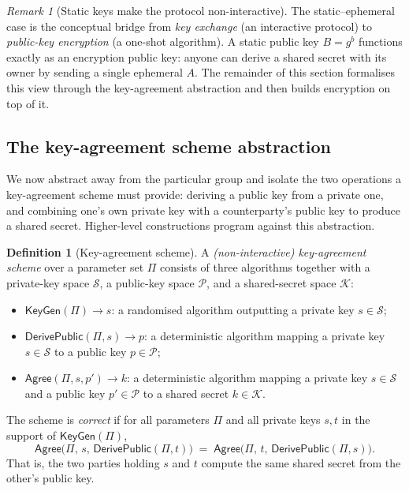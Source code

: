 \documentclass[11pt,a4paper]{article}
\theoremstyle{definition}
\newtheorem{definition}[theorem]{Definition}
\theoremstyle{remark}
\newtheorem{remark}[theorem]{Remark}
\begin{document}
\begin{remark}[Static keys make the protocol non-interactive]\label{keyagreement:rem:noninteractive}
The static--ephemeral case is the conceptual bridge from \emph{key exchange} (an interactive protocol) to \emph{public-key encryption} (a one-shot algorithm). A static public key \(B = g^b\) functions exactly as an encryption public key: anyone can derive a shared secret with its owner by sending a single ephemeral \(A\). The remainder of this section formalises this view through the key-agreement abstraction and then builds encryption on top of it.
\end{remark}

\subsection{The key-agreement scheme abstraction}\label{keyagreement:subsec:abstraction}

We now abstract away from the particular group and isolate the two operations a key-agreement scheme must provide: deriving a public key from a private one, and combining one's own private key with a counterparty's public key to produce a shared secret. Higher-level constructions program against this abstraction.

\begin{definition}[Key-agreement scheme]\label{keyagreement:def:kascheme}
A \emph{(non-interactive) key-agreement scheme} over a parameter set \(\Pi\) consists of three algorithms together with a private-key space \(\mathcal{S}\), a public-key space \(\mathcal{P}\), and a shared-secret space \(\mathcal{K}\):
\begin{itemize}
  \item \(\mathsf{KeyGen}(\Pi) \to s\): a randomised algorithm outputting a private key \(s \in \mathcal{S}\);
  \item \(\mathsf{DerivePublic}(\Pi, s) \to p\): a deterministic algorithm mapping a private key \(s \in \mathcal{S}\) to a public key \(p \in \mathcal{P}\);
  \item \(\mathsf{Agree}(\Pi, s, p') \to k\): a deterministic algorithm mapping a private key \(s \in \mathcal{S}\) and a public key \(p' \in \mathcal{P}\) to a shared secret \(k \in \mathcal{K}\).
\end{itemize}
The scheme is \emph{correct} if for all parameters \(\Pi\) and all private keys \(s, t\) in the support of \(\mathsf{KeyGen}(\Pi)\),
\begin{equation}\label{keyagreement:eq:correctness}
  \mathsf{Agree}\bigl(\Pi,\, s,\, \mathsf{DerivePublic}(\Pi, t)\bigr)
  \;=\;
  \mathsf{Agree}\bigl(\Pi,\, t,\, \mathsf{DerivePublic}(\Pi, s)\bigr).
\end{equation}
That is, the two parties holding \(s\) and \(t\) compute the same shared secret from the other's public key.
\end{definition}
\end{document}

